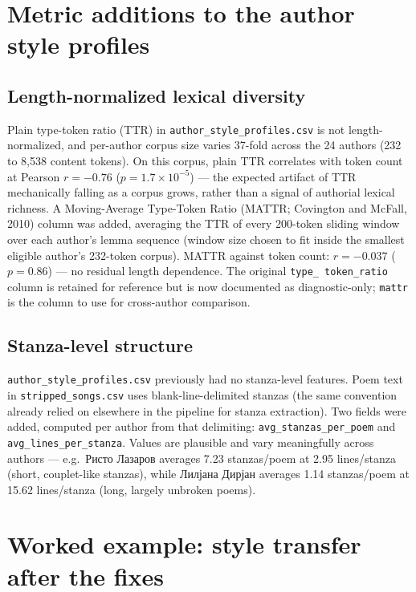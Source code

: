 \documentclass[11pt]{article}
\begin{document}
\section{Metric additions to the author style profiles}

\subsection{Length-normalized lexical diversity}

Plain type-token ratio (TTR) in \texttt{author\_style\_profiles.csv} is not
length-normalized, and per-author corpus size varies 37-fold across the 24
authors (232 to 8{,}538 content tokens). On this corpus, plain TTR
correlates with token count at Pearson $r = -0.76$ ($p = 1.7\times10^{-5}$)
— the expected artifact of TTR mechanically falling as a corpus grows,
rather than a signal of authorial lexical richness. A Moving-Average
Type-Token Ratio (MATTR; Covington and McFall, 2010) column was added,
averaging the TTR of every 200-token sliding window over each author's
lemma sequence (window size chosen to fit inside the smallest eligible
author's 232-token corpus). MATTR against token count: $r = -0.037$
($p = 0.86$) — no residual length dependence. The original \texttt{type\_
token\_ratio} column is retained for reference but is now documented as
diagnostic-only; \texttt{mattr} is the column to use for cross-author
comparison.

\subsection{Stanza-level structure}

\texttt{author\_style\_profiles.csv} previously had no stanza-level
features. Poem text in \texttt{stripped\_songs.csv} uses blank-line-delimited
stanzas (the same convention already relied on elsewhere in the pipeline for
stanza extraction). Two fields were added, computed per author from that
delimiting: \texttt{avg\_stanzas\_per\_poem} and
\texttt{avg\_lines\_per\_stanza}. Values are plausible and vary
meaningfully across authors — e.g.\ Ристо Лазаров averages 7.23
stanzas/poem at 2.95 lines/stanza (short, couplet-like stanzas), while
Лилјана Дирјан averages 1.14 stanzas/poem at 15.62 lines/stanza (long,
largely unbroken poems).

\section{Worked example: style transfer after the fixes}
\label{sec:example}
\end{document}

